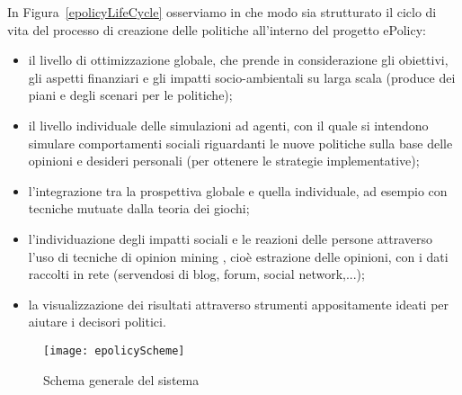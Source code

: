 \documentclass[12pt,a4paper,openright,twoside]{report}
\begin{document}
In Figura~\ref{epolicyLifeCycle} osserviamo in che modo sia strutturato il ciclo di vita del processo di creazione delle politiche all'interno del progetto ePolicy: \begin{itemize}
\item il livello di ottimizzazione globale, che prende in considerazione gli obiettivi, gli aspetti finanziari e gli impatti socio-ambientali su larga scala (produce dei piani e degli scenari per le politiche);
\item il livello individuale delle simulazioni ad agenti, con il quale si intendono simulare  comportamenti sociali riguardanti le nuove politiche sulla base delle opinioni e desideri personali (per ottenere le strategie implementative);
\item  l'integrazione tra la prospettiva globale e quella individuale, ad esempio con tecniche mutuate dalla teoria dei giochi;
\item l'individuazione degli impatti sociali e le reazioni delle persone attraverso l'uso di tecniche di opinion mining , cioè estrazione delle opinioni, con i dati raccolti in rete (servendosi di blog, forum, social network,...);
\item la visualizzazione dei risultati attraverso strumenti appositamente ideati per aiutare i decisori politici.
\end{itemize}


\begin{figure}[hbt]
	\centering
	\texttt{[image: epolicyScheme]}
	\caption{Schema generale del sistema}
	\label{epolicyScheme}
\end{figure}
\end{document}
